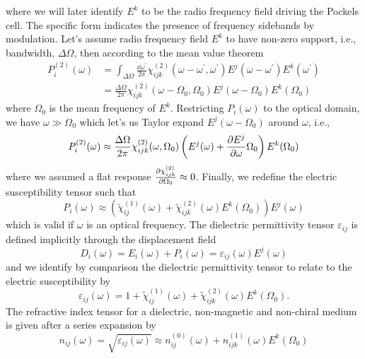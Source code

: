 where we will later identify $E^k$ to be the radio frequency field driving the Pockels cell.
The specific form indicates the presence of frequency sidebands by modulation.
Let's assume radio frequency field $E^k$ to have non-zero support, i.e., bandwidth, $\Delta\Omega$, then according to the mean value theorem
\begin{equation}
	\begin{split}
		P_i^{(2)}(\omega)
		&=
		\int_{\Delta\Omega}\frac{\dd{\omega^\prime}}{2\pi}
		\chi^{(2)}_{ijk}(\omega-\omega^\prime,\omega^\prime)
		E^j(\omega-\omega^\prime)
		E^k(\omega^\prime)
		\\
		&=
		\frac{\Delta\Omega}{2\pi}
		\chi^{(2)}_{ijk}(\omega-\Omega_0,\Omega_0)
		E^j(\omega-\Omega_0)
		E^k(\Omega_0)
	\end{split}
\end{equation}
where $\Omega_0$ is the mean frequency of $E^k$.
Restricting $P_i(\omega)$ to the optical domain, we have $\omega\gg\Omega_0$ which let's us Taylor expand $E^j(\omega-\Omega_0)$ around $\omega$, i.e.,
\begin{equation}
	P_i^{(2)}(\omega)
	\approx
	\frac{\Delta\Omega}{2\pi}
	\chi^{(2)}_{ijk}(\omega,\Omega_0)
	\left(
		E^j(\omega)
		+
		\pdv{E^j}{\omega}(\omega)\Omega_0
	\right)
	E^k(\Omega_0)
\end{equation}
where we assumed a flat response $\pdv{\chi_{ijk}^{(2)}}{\Omega_0}\approx0$.
Finally, we redefine the electric susceptibility tensor such that
\begin{equation}
	P_i(\omega)
	\approx
	\left(
		\tilde{\chi}^{(1)}_{ij}(\omega)
		+
		\tilde{\chi}^{(2)}_{ijk}(\omega)
		E^k(\Omega_0)
	\right)
	E^j(\omega)
\end{equation}
which is valid if $\omega$ is an optical frequency.
The dielectric permittivity tensor $\varepsilon_{ij}$ is defined implicitly through the displacement field
\begin{equation}
	D_i(\omega)
	=
	E_i(\omega)
	+
	P_i(\omega)
	=
	\varepsilon_{ij}(\omega)
	E^j(\omega)
\end{equation}
and we identify by comparison the dielectric permittivity tensor to relate to the electric susceptibility by
\begin{equation}
	\varepsilon_{ij}(\omega)
	=
	1
	+
	\tilde{\chi}^{(1)}_{ij}(\omega)
	+
	\tilde{\chi}^{(2)}_{ijk}(\omega)
	E^k(\Omega_0)
	.
\end{equation}
The refractive index tensor for a dielectric, non-magnetic and non-chiral medium is given after a series expansion by~\cite{Rerat2020}
\begin{equation}
	n_{ij}(\omega)
	=
	\sqrt{\varepsilon_{ij}(\omega)}
	\approx
	n^{(0)}_{ij}(\omega)
	+
	n^{(1)}_{ijk}(\omega)
	E^k(\Omega_0)
\end{equation}
